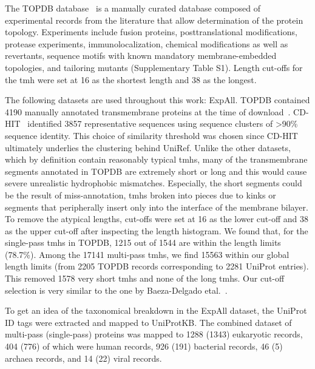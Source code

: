 The TOPDB database~\cite{Dobson2015} is a manually curated database composed of experimental records from the literature that allow determination of the protein topology. Experiments include fusion proteins, posttranslational modifications, protease experiments, immunolocalization, chemical modifications as well as revertants, sequence motifs with known mandatory membrane-embedded topologies, and tailoring mutants (Supplementary Table S1). Length cut-offs for the \gls{tmh} were set at 16 as the shortest length and 38 as the longest.

The following datasets are used throughout this work:
ExpAll. TOPDB contained 4190 manually annotated transmembrane proteins at the time of download~\cite{Dobson2015}. CD-HIT~\cite{Huang2010} identified 3857 representative sequences using sequence clusters of >90\% sequence identity. This choice of similarity threshold was chosen since CD-HIT ultimately underlies the clustering behind UniRef. Unlike the other datasets, which by definition contain reasonably typical \gls{tmh}s, many of the transmembrane segments annotated in TOPDB are extremely short or long and this would cause severe unrealistic hydrophobic mismatches. Especially, the short segments could be the result of miss-annotation, \gls{tmh}s broken into pieces due to kinks or segments that peripherally insert only into the interface of the membrane bilayer. To remove the atypical lengths, cut-offs were set at 16 as the lower cut-off and 38 as the upper cut-off after inspecting the length histogram. We found that, for the single-pass \gls{tmh}s in TOPDB, 1215 out of 1544 are within the length limits (78.7\%). Among the 17141 multi-pass \gls{tmh}s, we find 15563 within our global length limits (from 2205 TOPDB records corresponding to 2281 UniProt entries). This removed 1578 very short \gls{tmh}s and none of the long \gls{tmh}s. Our cut-off selection is very similar to the one by Baeza-Delgado etal.~\cite{Baeza-Delgado2013}.

To get an idea of the taxonomical breakdown in the ExpAll dataset, the UniProt ID tags were extracted and mapped to UniProtKB. The combined dataset of multi-pass (single-pass) proteins was mapped to 1288 (1343) eukaryotic records, 404 (776) of which were human records, 926 (191) bacterial records, 46 (5) archaea records, and 14 (22) viral records.

